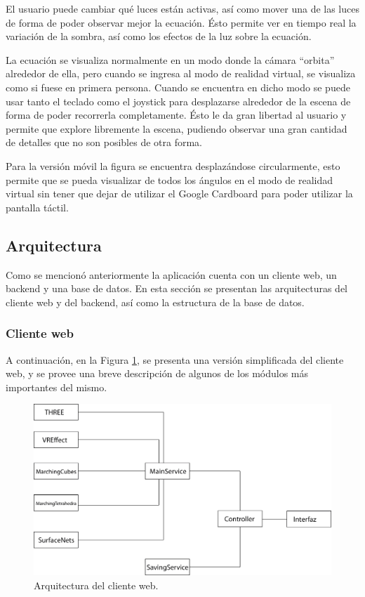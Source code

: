 \documentclass[12pt]{article}
\begin{document}
El usuario puede cambiar qué luces están activas, así como mover una de las luces de forma de poder observar mejor la ecuación. Ésto permite ver en tiempo real la variación de la sombra, así como los efectos de la luz sobre la ecuación. 

La ecuación se visualiza normalmente en un modo donde la cámara “orbita” alrededor de ella, pero cuando se ingresa al modo de realidad virtual, se visualiza como si fuese en primera persona. Cuando se encuentra en dicho modo se puede usar tanto el teclado como el joystick para desplazarse alrededor de la escena de forma de poder recorrerla completamente. Ésto le da gran libertad al usuario y permite que explore libremente la escena, pudiendo observar una gran cantidad de detalles que no son posibles de otra forma.

Para la versión móvil la figura se encuentra desplazándose circularmente, esto permite que se pueda visualizar de todos los ángulos en el modo de realidad virtual sin tener que dejar de utilizar el Google Cardboard para poder utilizar la pantalla táctil.
\clearpage
\subsection{Arquitectura}
Como se mencionó anteriormente la aplicación cuenta con un cliente web, un backend y una base de datos. En esta sección se presentan las arquitecturas del cliente web y del backend, así como la estructura de la base de datos.
\subsubsection{Cliente web}
A continuación, en la Figura \ref{arq}, se presenta una versión simplificada del cliente web, y se provee una breve descripción de algunos de los módulos más importantes del mismo.\\
\begin{figure}[h]
\includegraphics[width=\textwidth]{arq_sim.png}
\caption{Arquitectura del cliente web.}
\label{arq}
\end{figure}
\end{document}
